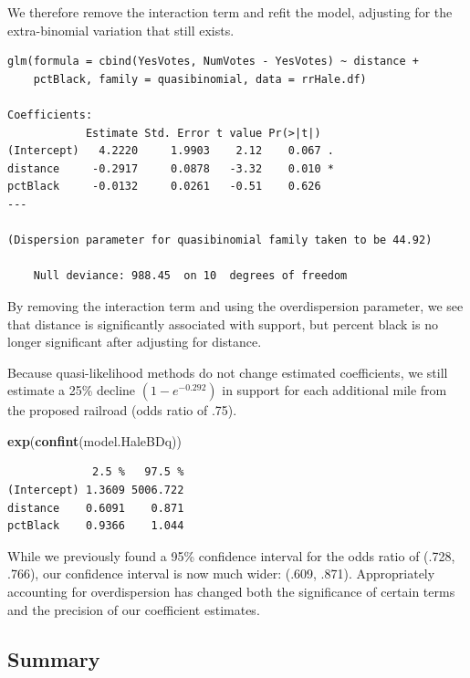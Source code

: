 \documentclass[
]{krantz}
\newenvironment{Shaded}{\begin{snugshade}}{\end{snugshade}}
\newcommand{\KeywordTok}[1]{\textcolor[rgb]{0.27,0.27,0.27}{\textbf{#1}}}
\newcommand{\NormalTok}[1]{#1}
\begin{document}
We therefore remove the interaction term and refit the model, adjusting for the extra-binomial variation that still exists.

\begin{verbatim}
glm(formula = cbind(YesVotes, NumVotes - YesVotes) ~ distance + 
    pctBlack, family = quasibinomial, data = rrHale.df)

Coefficients:
            Estimate Std. Error t value Pr(>|t|)  
(Intercept)   4.2220     1.9903    2.12    0.067 .
distance     -0.2917     0.0878   -3.32    0.010 *
pctBlack     -0.0132     0.0261   -0.51    0.626  
---

(Dispersion parameter for quasibinomial family taken to be 44.92)

    Null deviance: 988.45  on 10  degrees of freedom
\end{verbatim}

By removing the interaction term and using the overdispersion parameter, we see that distance is significantly associated with support, but percent black is no longer significant after adjusting for distance.

Because quasi-likelihood methods do not change estimated coefficients, we still estimate a 25\% decline \((1-e^{-0.292})\) in support for each additional mile from the proposed railroad (odds ratio of .75).

\begin{Shaded}
\begin{Highlighting}[]
\KeywordTok{exp}\NormalTok{(}\KeywordTok{confint}\NormalTok{(model.HaleBDq))}
\end{Highlighting}
\end{Shaded}

\begin{verbatim}
             2.5 %   97.5 %
(Intercept) 1.3609 5006.722
distance    0.6091    0.871
pctBlack    0.9366    1.044
\end{verbatim}

While we previously found a 95\% confidence interval for the odds ratio of (.728, .766), our confidence interval is now much wider: (.609, .871). Appropriately accounting for overdispersion has changed both the significance of certain terms and the precision of our coefficient estimates.

\hypertarget{summary-1}{%
\subsection{Summary}\label{summary-1}}
\end{document}
